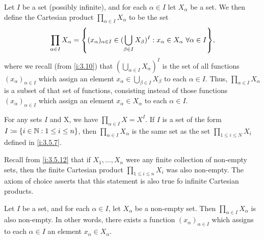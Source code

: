 \begin{defn}\label{i:8.4.1}
  Let \(I\) be a set (possibly infinite), and for each \(\alpha \in I\) let \(X_{\alpha}\) be a set.
  We then define the Cartesian product \(\prod_{\alpha \in I} X_{\alpha}\) to be the set
  \[
    \prod_{\alpha \in I} X_{\alpha} = \set{(x_{\alpha})_{\alpha \in I} \in (\bigcup_{\beta \in I} X_{\beta})^I : x_{\alpha} \in X_{\alpha} \ \forall \alpha \in I},
  \]
  where we recall (from \cref{i:3.10}) that \((\bigcup_{\alpha \in I} X_{\alpha})^I\) is the set of all functions \((x_{\alpha})_{\alpha \in I}\) which assign an element \(x_{\alpha} \in \bigcup_{\beta \in I} X_{\beta}\) to each \(\alpha \in I\).
  Thus, \(\prod_{\alpha \in I} X_{\alpha}\) is a subset of that set of functions, consisting instead of those functions \((x_{\alpha})_{\alpha \in I}\) which assign an element \(x_{\alpha} \in X_{\alpha}\) to each \(\alpha \in I\).
\end{defn}

\begin{eg}\label{i:8.4.2}
  For any sets \(I\) and X, we have \(\prod_{\alpha \in I} X = X^I\).
  If \(I\) is a set of the form \(I \coloneqq \left\lbrace i \in \mathbb{N} : 1 \leq i \leq n\right\rbrace\), then \(\prod_{\alpha \in I} X_{\alpha}\) is the same set as the set \(\prod_{1 \leq i \leq N} X_i\) defined in \cref{i:3.5.7}.
\end{eg}

\begin{note}
  Recall from \cref{i:3.5.12} that if \(X_1, \dots, X_n\) were any finite collection of non-empty sets, then the finite Cartesian product \(\prod_{1 \leq i \leq n} X_i\) was also non-empty.
  The axiom of choice asserts that this statement is also true fo infinite Cartesian products.
\end{note}

\begin{ax}[Choice]\label{i:8.1}
  Let \(I\) be a set, and for each \(\alpha \in I\), let \(X_{\alpha}\) be a non-empty set.
  Then \(\prod_{\alpha \in I} X_{\alpha}\) is also non-empty.
  In other words, there exists a function \((x_{\alpha})_{\alpha \in I}\) which assigns to each \(\alpha \in I\) an element \(x_{\alpha} \in X_{\alpha}\).
\end{ax}

